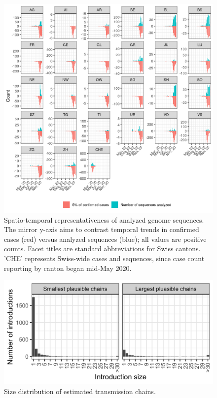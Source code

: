 \documentclass[9pt,twoside,lineno]{pnas-new}
\begin{document}


\begin{figure}
\centering
\includegraphics[width = 11.4cm]{figures/CHE_downsampling.png}
\caption{Spatio-temporal representativeness of analyzed genome sequences. The mirror y-axis aims to contrast temporal trends in confirmed cases (red) versus analyzed sequences (blue); all values are positive counts. Facet titles are standard abbreviations for Swiss cantons. 'CHE' represents Swiss-wide cases and sequences, since case count reporting by canton began mid-May 2020.}  
\label{fig:downsampling_representativeness}
\end{figure}

\begin{figure}
\centering
\includegraphics[width = 11.4cm]{figures/chain_size_dist.png}
\caption{Size distribution of estimated transmission chains.}  
\label{fig:chain_size_dist}
\end{figure}
\end{document}
